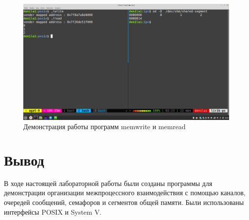 \documentclass[a4paper,14pt]{extarticle}
\begin{document}
 
 \begin{figure}[h!]
 	\centering
 	\includegraphics[width=0.9\linewidth]{images/6/demo2}
 	\caption{Демонстрация работы программ memwrite и memread}
 	\label{fig:demo2}
 \end{figure}
 


\clearpage
\section{Вывод}

В ходе настоящей лабораторной работы были созданы программы для демонстрации организации межпроцессного взаимодействия с помощью каналов, очередей сообщений, семафоров и сегментов общей памяти. Были использованы интерфейсы POSIX и System V. 
\end{document}
